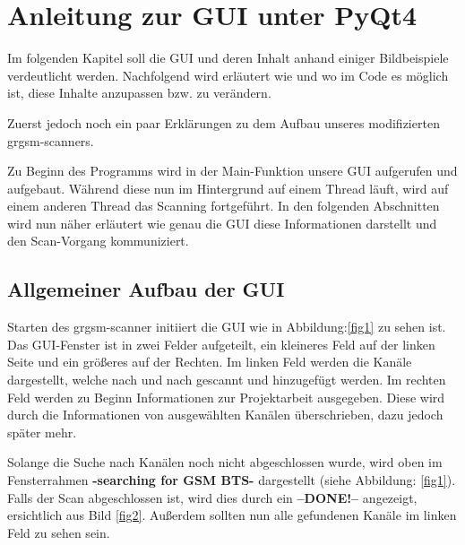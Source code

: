 
\chapter{Anleitung zur GUI unter PyQt4}

Im folgenden Kapitel soll die GUI und deren Inhalt anhand einiger Bildbeispiele verdeutlicht werden.
Nachfolgend wird erläutert wie und wo im Code es möglich ist, diese Inhalte anzupassen bzw. zu verändern.

Zuerst jedoch noch ein paar Erklärungen zu dem Aufbau unseres modifizierten grgsm-scanners.

Zu Beginn des Programms wird in der Main-Funktion unsere GUI aufgerufen und aufgebaut. Während diese nun im Hintergrund auf einem Thread läuft, wird auf einem anderen Thread das Scanning fortgeführt.
In den folgenden Abschnitten wird nun näher erläutert wie genau die GUI diese Informationen darstellt und den Scan-Vorgang kommuniziert.

\section{Allgemeiner Aufbau der GUI}


Starten des grgsm-scanner initiiert die GUI wie in Abbildung:\ref{fig1} zu sehen ist.
Das GUI-Fenster ist in zwei Felder aufgeteilt, ein kleineres Feld auf der linken Seite
und ein größeres auf der Rechten.
Im linken Feld werden die Kanäle dargestellt, welche nach und nach gescannt und hinzugefügt werden.
Im rechten Feld werden zu Beginn Informationen zur Projektarbeit ausgegeben. Diese wird durch die Informationen von ausgewählten Kanälen überschrieben, dazu jedoch später mehr.


\noindent Solange die Suche nach Kanälen noch nicht abgeschlossen wurde, wird oben im Fensterrahmen \textbf{-searching for GSM BTS-} dargestellt (siehe Abbildung: \ref{fig1}).
Falls der Scan abgeschlossen ist, wird dies durch ein \textbf{--DONE!--} angezeigt, ersichtlich aus Bild \ref{fig2}. Außerdem sollten nun alle gefundenen Kanäle im linken Feld zu sehen sein.

%
%



